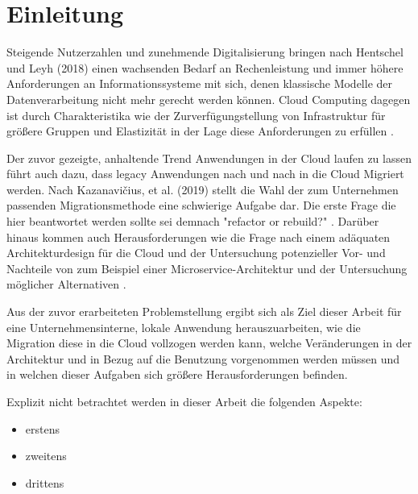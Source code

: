 
\chapter{Einleitung}


Steigende Nutzerzahlen und zunehmende Digitalisierung bringen nach Hentschel und Leyh (2018) einen wachsenden Bedarf an Rechenleistung und immer höhere Anforderungen an Informationssysteme mit sich, denen klassische Modelle der Datenverarbeitung nicht mehr gerecht werden können. Cloud Computing dagegen ist durch Charakteristika wie der Zurverfügungstellung von Infrastruktur für größere Gruppen und Elastizität \cite[Vgl.][S. 2]{Mell2011} in der Lage diese Anforderungen zu erfüllen \cite[Vgl.][S. 6]{Reinheimer2018}.

Der zuvor gezeigte, anhaltende Trend Anwendungen in der Cloud laufen zu lassen führt auch dazu, dass legacy Anwendungen nach und nach in die Cloud Migriert werden. Nach Kazanavičius, et al. (2019) stellt die Wahl der zum Unternehmen passenden Migrationsmethode eine schwierige Aufgabe dar. Die erste Frage die hier beantwortet werden sollte sei demnach "refactor or rebuild?" \cite[Vgl.][S. 4]{Kazanavicius2019}. Darüber hinaus kommen auch Herausforderungen wie die Frage nach einem adäquaten Architekturdesign für die Cloud \cite[Vgl.][S. 14]{Pahl} und der Untersuchung potenzieller Vor- und Nachteile
von zum Beispiel einer Microservice-Architektur und der Untersuchung möglicher Alternativen \cite[Vgl.][S. 3]{Carrasco2018}.

Aus der zuvor erarbeiteten Problemstellung ergibt sich als Ziel dieser Arbeit für eine Unternehmensinterne, lokale Anwendung herauszuarbeiten, wie die Migration diese in die Cloud vollzogen werden kann, welche Veränderungen in der Architektur und in Bezug auf die Benutzung vorgenommen werden müssen und in welchen dieser Aufgaben sich größere Herausforderungen befinden.

Explizit nicht betrachtet werden in dieser Arbeit die folgenden Aspekte:
\begin{itemize}
\item erstens
\item zweitens
\item drittens
\end{itemize}

\pagebreak



